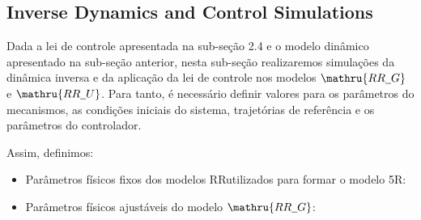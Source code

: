 \subsection{Inverse Dynamics and Control Simulations}\label{S04-4}

Dada a lei de controle apresentada na sub-se\c{c}\~ao 2.4 e o modelo din\^amico apresentado na sub-se\c{c}\~ao anterior, nesta sub-se\c{c}\~ao realizaremos simula\c{c}\~oes da din\^amica inversa e da aplica\c{c}\~ao da lei de controle nos modelos $\mathru{RR{\ud}G}$ e $\mathru{RR{\ud}U}$. Para tanto, \'e necess\'ario definir valores para os par\^ametros do mecanismos, as condi\c{c}\~oes iniciais do sistema, trajetórias de referência e os par\^ametros do controlador.

Assim, definimos:

\begin{itemize}
\item Par\^ametros f\'isicos fixos dos modelos RR\ud utilizados para formar o modelo 5R\ud:

\begin{itemize}
\end{itemize}

\item Par\^ametros físicos ajustáveis do modelo $\mathru{RR{\ud}G}$:

\begin{itemize}
\end{itemize}


\end{itemize}
